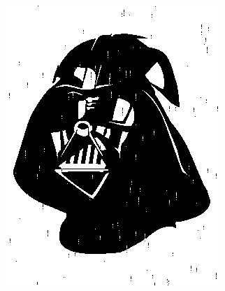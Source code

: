 \documentclass[]{article}
\begin{document}
\begin{section}
\begin{subsection}
\begin{figure}[h]
\begin{subfigure}{0.24\textwidth}
                \includegraphics[width=\textwidth]{ham_coded.png}
                \caption{}
                \label{fig:ham_coded}
            \end{subfigure}
            \begin{subfigure}{0.24\textwidth}
                \centering

\end{subfigure}
\end{figure}
\end{subsection}
\end{section}
\end{document}
